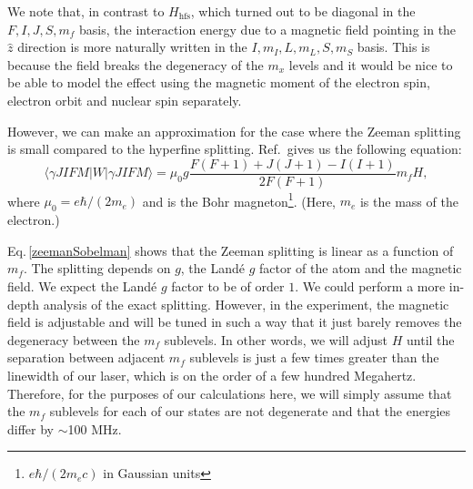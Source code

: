 We note that, in contrast to $H_{\mathrm{hfs}}$, which turned out to be diagonal in the $F, I, J, S, m_f$ basis, the interaction energy due to a magnetic field pointing in the $\hat{z}$ direction is more naturally written in the $I, m_I, L, m_L, S, m_S$ basis. This is because the field breaks the degeneracy of the $m_x$ levels and it would be nice to be able to model the effect using the magnetic moment of the electron spin, electron orbit and nuclear spin separately. 

However, we can make an approximation for the case where the Zeeman splitting is small compared to the hyperfine splitting. 
Ref.\,\cite{sobelman_spectra} gives us the following equation:
\begin{equation} \label{zeemanSobelman}
\langle{\gamma JIFM|W|\gamma JIFM\rangle = \mu_0 g \frac{F(F+1)+J(J+1)-I(I+1)}{2F(F+1)}m_f H},
\end{equation}
where $\mu_0=e\hbar/(2 m_e)$ and is the Bohr magneton\footnote{$e \hbar / (2 m_e c)$ in Gaussian units}. (Here, $m_e$ is the mass of the electron.)

Eq.\,\ref{zeemanSobelman} shows that the Zeeman splitting is linear as a function of $m_f$. The splitting depends on $g$, the Land\'e $g$ factor of the atom and the magnetic field. We expect the Land\'e $g$ factor to be of order $1$. We could perform a more in-depth analysis of the exact splitting. However, in the experiment, the magnetic field is adjustable and will be tuned in such a way that it just barely removes the degeneracy between the $m_f$ sublevels. In other words, we will adjust $H$ until the separation between adjacent $m_f$ sublevels is just a few times greater than the linewidth of our laser, which is on the order of a few hundred Megahertz. Therefore, for the purposes of our calculations here, we will simply assume that the $m_f$ sublevels for each of our states are not degenerate and that the energies differ by $\sim$100 MHz.


